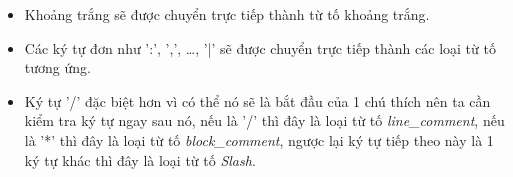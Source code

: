\begin{itemize}
  \item Khoảng trắng sẽ được chuyển trực tiếp thành từ tố khoảng trắng.
  
  
  
  \item Các ký tự đơn như ':', ',', \dots , '|' sẽ được chuyển trực tiếp thành các loại từ tố tương ứng.
  
  
  
  
  \item Ký tự '/' đặc biệt hơn vì có thể nó sẽ là bắt đầu của 1 chú thích nên ta cần kiểm tra ký tự ngay sau nó, nếu là '/' thì đây là loại từ tố \textit{line\_comment}, nếu là '*' thì đây là loại từ tố \textit{block\_comment}, ngược lại ký tự tiếp theo này là 1 ký tự khác thì đây là loại từ tố \textit{Slash}.
  

\end{itemize}
